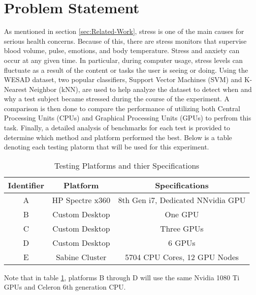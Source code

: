 \section{Problem Statement}
\label{sec:Problem-Statement}

As mentioned in section \ref{sec:Related-Work}, stress is one of the main causes for serious health concerns.
Because of this, there are stress monitors that supervise blood volume, pulse, emotions, and 
body temperature. Stress and anxiety can occur at any given time. In particular, during computer usage, stress levels 
can fluctuate as a result of the content or tasks the user is seeing or doing. Using the WESAD dataset, two popular 
classifiers, Support Vector Machines (SVM) and K-Nearest Neighbor (kNN), are used to help analyze the dataset 
to detect when and why a test subject became stressed during the course of the experiment. 
A comparison is then done to compare the performance of utilizing both Central Processing Units (CPUs) and 
Graphical Processing Units (GPUs) to perfrom this task. 
Finally, a detailed analysis of benchmarks for each test is provided to determine which method and platform 
performed the best. Below is a table denoting each testing platorm that will be used for this experiment. 

\begin{table}[h!]
\centering
\caption{Testing Platforms and thier Specifications}
\label{table:testing-platforms}
\begin{tabular}{||c c c||} 
 \hline
 Identifier & Platform  & Specifications  	\\ [0.5ex] 
 \hline\hline
 A 	& HP Spectre x360 	 & 8th Gen i7, Dedicated NNvidia GPU 	\\ 
 B 	& Custom Desktop	 & One GPU   	\\
 C 	& Custom Desktop	 & Three GPUs	\\
 D 	& Custom Desktop	 & 6 GPUs	\\
 E 	& Sabine Cluster	 & 5704 CPU Cores, 12 GPU Nodes 	 	\\ [1ex] 
 \hline
\end{tabular}
\end{table}

Note that in table \ref{table:testing-platforms}, platforms B through D will use the same Nvidia 1080 Ti GPUs and 
Celeron 6th generation CPU.

